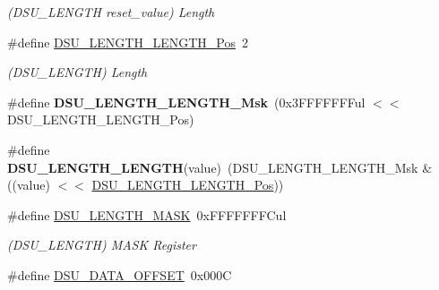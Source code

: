 \begin{DoxyCompactItemize}
\begin{DoxyCompactList}\small\item\em (D\+S\+U\+\_\+\+L\+E\+N\+G\+T\+H reset\+\_\+value) Length \end{DoxyCompactList}\item 
\hypertarget{group___s_a_m_l21___d_s_u_ga6aa7babac0719eb769c08ca1a945aa57}{}\#define \hyperlink{group___s_a_m_l21___d_s_u_ga6aa7babac0719eb769c08ca1a945aa57}{D\+S\+U\+\_\+\+L\+E\+N\+G\+T\+H\+\_\+\+L\+E\+N\+G\+T\+H\+\_\+\+Pos}~2\label{group___s_a_m_l21___d_s_u_ga6aa7babac0719eb769c08ca1a945aa57}

\begin{DoxyCompactList}\small\item\em (D\+S\+U\+\_\+\+L\+E\+N\+G\+T\+H) Length \end{DoxyCompactList}\item 
\hypertarget{group___s_a_m_l21___d_s_u_gaf8420428fca225dd9b92fb53c4498124}{}\#define {\bfseries D\+S\+U\+\_\+\+L\+E\+N\+G\+T\+H\+\_\+\+L\+E\+N\+G\+T\+H\+\_\+\+Msk}~(0x3\+F\+F\+F\+F\+F\+F\+Ful $<$$<$ D\+S\+U\+\_\+\+L\+E\+N\+G\+T\+H\+\_\+\+L\+E\+N\+G\+T\+H\+\_\+\+Pos)\label{group___s_a_m_l21___d_s_u_gaf8420428fca225dd9b92fb53c4498124}

\item 
\hypertarget{group___s_a_m_l21___d_s_u_ga89bbb4abfbd477e9791957d57d5baf5f}{}\#define {\bfseries D\+S\+U\+\_\+\+L\+E\+N\+G\+T\+H\+\_\+\+L\+E\+N\+G\+T\+H}(value)~(D\+S\+U\+\_\+\+L\+E\+N\+G\+T\+H\+\_\+\+L\+E\+N\+G\+T\+H\+\_\+\+Msk \& ((value) $<$$<$ \hyperlink{group___s_a_m_l21___d_s_u_ga6aa7babac0719eb769c08ca1a945aa57}{D\+S\+U\+\_\+\+L\+E\+N\+G\+T\+H\+\_\+\+L\+E\+N\+G\+T\+H\+\_\+\+Pos}))\label{group___s_a_m_l21___d_s_u_ga89bbb4abfbd477e9791957d57d5baf5f}

\item 
\hypertarget{group___s_a_m_l21___d_s_u_ga1bdb22215616287bf9f8ee6b97e7f803}{}\#define \hyperlink{group___s_a_m_l21___d_s_u_ga1bdb22215616287bf9f8ee6b97e7f803}{D\+S\+U\+\_\+\+L\+E\+N\+G\+T\+H\+\_\+\+M\+A\+S\+K}~0x\+F\+F\+F\+F\+F\+F\+F\+Cul\label{group___s_a_m_l21___d_s_u_ga1bdb22215616287bf9f8ee6b97e7f803}

\begin{DoxyCompactList}\small\item\em (D\+S\+U\+\_\+\+L\+E\+N\+G\+T\+H) M\+A\+S\+K Register \end{DoxyCompactList}\item 
\hypertarget{group___s_a_m_l21___d_s_u_ga723e04c18648c402a75cce7e93de351a}{}\#define \hyperlink{group___s_a_m_l21___d_s_u_ga723e04c18648c402a75cce7e93de351a}{D\+S\+U\+\_\+\+D\+A\+T\+A\+\_\+\+O\+F\+F\+S\+E\+T}~0x000\+C\label{group___s_a_m_l21___d_s_u_ga723e04c18648c402a75cce7e93de351a}


\end{DoxyCompactItemize}
